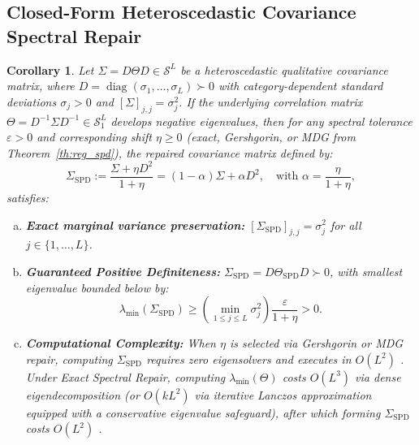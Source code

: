 \documentclass[default,sn-mathphys,Numbered]{sn-jnl}
\theoremstyle{thmstyleone}
\newtheorem{corollary}[theorem]{Corollary}
\theoremstyle{thmstylethree}
\theoremstyle{thmstyletwo}
\newcommand{\diag}{\operatorname{diag}}
\begin{document}
\begin{appendices}
\subsection{Closed-Form Heteroscedastic Covariance Spectral Repair}
\begin{corollary}
\label{cor:heteroscedastic_repair}
Let $\Sigma = D \Theta D \in \mathcal{S}^L$ be a heteroscedastic qualitative covariance matrix, where $D = \diag(\sigma_1, \dots, \sigma_L) \succ 0$ with category-dependent standard deviations $\sigma_j > 0$ and $[\Sigma]_{j, j} = \sigma_j^2$. If the underlying correlation matrix $\Theta = D^{-1} \Sigma D^{-1} \in \mathcal{S}_1^L$ develops negative eigenvalues, then for any spectral tolerance $\varepsilon > 0$ and corresponding shift $\eta \ge 0$ (exact, Gershgorin, or MDG from Theorem~\ref{th:reg_spd}), the repaired covariance matrix defined by:
\begin{equation}
\label{eq:heteroscedastic_repair}
\Sigma_{\mathrm{SPD}} := \frac{\Sigma + \eta D^2}{1 + \eta} = (1 - \alpha) \Sigma + \alpha D^2, \quad \text{with } \alpha = \frac{\eta}{1 + \eta},
\end{equation}
satisfies:
\begin{enumerate}[(a)]
    \item \textbf{Exact marginal variance preservation:} $[\Sigma_{\mathrm{SPD}}]_{j, j} = \sigma_j^2$ for all $j \in \{1, \dots, L\}$.
    \item \textbf{Guaranteed Positive Definiteness:} $\Sigma_{\mathrm{SPD}} = D \Theta_{\mathrm{SPD}} D \succ 0$, with smallest eigenvalue bounded below by:
    \begin{equation}
    \lambda_{\min}(\Sigma_{\mathrm{SPD}}) \ge \left( \min_{1 \le j \le L} \sigma_j^2 \right) \frac{\varepsilon}{1 + \eta} > 0.
    \end{equation}
    \item \textbf{Computational Complexity:} When $\eta$ is selected via Gershgorin or MDG repair, computing $\Sigma_{\mathrm{SPD}}$ requires zero eigensolvers and executes in $O(L^2)$ . Under Exact Spectral Repair, computing $\lambda_{\min}(\Theta)$ costs $O(L^3)$  via dense eigendecomposition (or $O(k L^2)$  via iterative Lanczos approximation equipped with a conservative eigenvalue safeguard), after which forming $\Sigma_{\mathrm{SPD}}$ costs $O(L^2)$ .
\end{enumerate}
\end{corollary}


\end{appendices}
\end{document}
